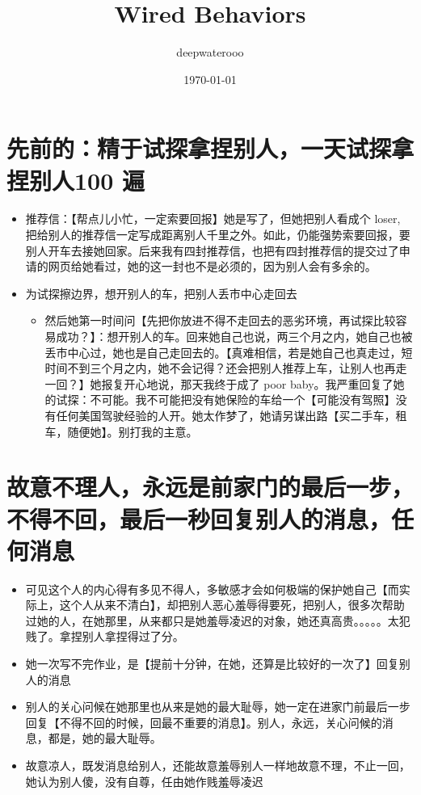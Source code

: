 \documentclass[9pt, b5paper]{article}
\author{deepwaterooo}
\date{\today}
\title{Wired Behaviors}
\begin{document}
\maketitle
\tableofcontents


\section{先前的：精于试探拿捏别人，一天试探拿捏别人100 遍}
\label{sec-1}
\begin{itemize}
\item 推荐信：【帮点儿小忙，一定索要回报】她是写了，但她把别人看成个 loser, 把给别人的推荐信一定写成距离别人千里之外。如此，仍能强势索要回报，要别人开车去接她回家。后来我有四封推荐信，也把有四封推荐信的提交过了申请的网页给她看过，她的这一封也不是必须的，因为别人会有多余的。
\item 为试探擦边界，想开别人的车，把别人丢市中心走回去
\begin{itemize}
\item 然后她第一时间问【先把你放进不得不走回去的恶劣环境，再试探比较容易成功？】：想开别人的车。回来她自己也说，两三个月之内，她自己也被丢市中心过，她也是自己走回去的。【真难相信，若是她自己也真走过，短时间不到三个月之内，她不会记得？还会把别人推荐上车，让别人也再走一回？】她报复开心地说，那天我终于成了 poor baby。我严重回复了她的试探：不可能。我不可能把没有她保险的车给一个【可能没有驾照】没有任何美国驾驶经验的人开。她太作梦了，她请另谋出路【买二手车，租车，随便她】。别打我的主意。
\end{itemize}
\end{itemize}
\section{故意不理人，永远是前家门的最后一步，不得不回，最后一秒回复别人的消息，任何消息}
\label{sec-2}
\begin{itemize}
\item 可见这个人的内心得有多见不得人，多敏感才会如何极端的保护她自己【而实际上，这个人从来不清白】，却把别人恶心羞辱得要死，把别人，很多次帮助过她的人，在她那里，从来都只是她羞辱凌迟的对象，她还真高贵。。。。。太犯贱了。拿捏别人拿捏得过了分。
\item 她一次写不完作业，是【提前十分钟，在她，还算是比较好的一次了】回复别人的消息
\item 别人的关心问候在她那里也从来是她的最大耻辱，她一定在进家门前最后一步回复【不得不回的时候，回最不重要的消息】。别人，永远，关心问候的消息，都是，她的最大耻辱。

\item 故意凉人，既发消息给别人，还能故意羞辱别人一样地故意不理，不止一回，她认为别人傻，没有自尊，任由她作贱羞辱凌迟
\end{itemize}
\end{document}
